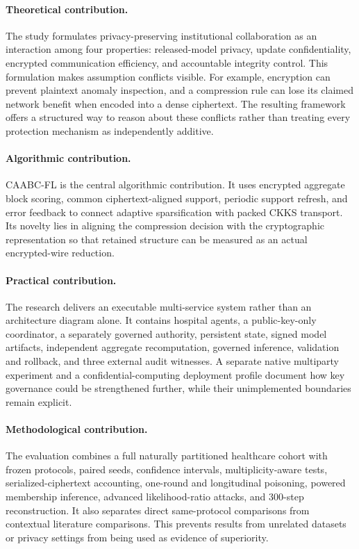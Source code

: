 \paragraph{Theoretical contribution.}
The study formulates privacy-preserving institutional collaboration as an interaction among four properties: released-model privacy, update confidentiality, encrypted communication efficiency, and accountable integrity control. This formulation makes assumption conflicts visible. For example, encryption can prevent plaintext anomaly inspection, and a compression rule can lose its claimed network benefit when encoded into a dense ciphertext. The resulting framework offers a structured way to reason about these conflicts rather than treating every protection mechanism as independently additive.

\paragraph{Algorithmic contribution.}
CAABC-FL is the central algorithmic contribution. It uses encrypted aggregate block scoring, common ciphertext-aligned support, periodic support refresh, and error feedback to connect adaptive sparsification with packed CKKS transport. Its novelty lies in aligning the compression decision with the cryptographic representation so that retained structure can be measured as an actual encrypted-wire reduction.

\paragraph{Practical contribution.}
The research delivers an executable multi-service system rather than an architecture diagram alone. It contains hospital agents, a public-key-only coordinator, a separately governed authority, persistent state, signed model artifacts, independent aggregate recomputation, governed inference, validation and rollback, and three external audit witnesses. A separate native multiparty experiment and a confidential-computing deployment profile document how key governance could be strengthened further, while their unimplemented boundaries remain explicit.

\paragraph{Methodological contribution.}
The evaluation combines a full naturally partitioned healthcare cohort with frozen protocols, paired seeds, confidence intervals, multiplicity-aware tests, serialized-ciphertext accounting, one-round and longitudinal poisoning, powered membership inference, advanced likelihood-ratio attacks, and 300-step reconstruction. It also separates direct same-protocol comparisons from contextual literature comparisons. This prevents results from unrelated datasets or privacy settings from being used as evidence of superiority.

